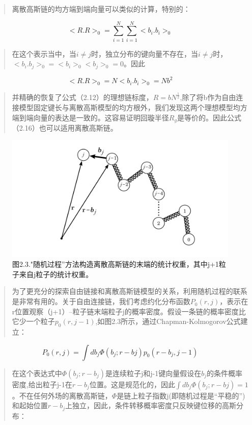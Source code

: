 \begin{quotation}
离散高斯链的均方端到端向量可以类似的计算，特别的：
\end{quotation}
\begin{equation}
<R.R>_{0}=\sum_{i=1}^{N}\sum_{i=1}^{N}<b_{i}.b_{i}>_{0}
\end{equation}
\begin{quotation}
在这个表示当中，当$i\neq j$时，独立分布的键向量不存在，当$i\neq j$时，$<b_{i}.b_{j}>_{0}=<b_{i}>_{0}<b_{j}>_{0}=0$。因此
\end{quotation}
\begin{equation}
<R.R>_{0}=N<b_{i}.b_{i}>_{0}=Nb^2
\end{equation}
\begin{quotation}
并精确的恢复了公式（2.12）的理想链标度，$R=bN^\frac{1}{2}$,除了将b作为自由连接模型固定键长与离散高斯模型的均方根外，我们发现这两个理想模型均方端到端向量的表达是一致的。这容易证明回璇半径$R_{g}$是等价的。因此公式（2.16）也可以适用离散高斯链。
\end{quotation}
\begin{figure}[h]
\centering
\includegraphics[width=12cm]{./figures/23.png}
\caption{图2.3."随机过程”方法构造离散高斯链的末端的统计权重，其中j+1粒子来自j粒子的统计权重。}
\end{figure}
\newpage
\begin{quotation}
为了更充分的探索自由链接和离散高斯链模型的关系，利用随机过程的联系是非常有用的。关于自由连接链，我们考虑约化分布函数$P_{0}(r,j)$，表示在r位置观察（j+1）--粒子链末端粒子j的概率密度。假设一条链的概率密度比它少一个粒子$p_{0}(r,j-1)$,如图2.3所示，通过Chapman-Kolmogorov公式建立：
\end{quotation}
\begin{equation}
P_{0}(r,j)=\int db_{j} \varPhi (b_{j};r-b{j})p_{0}(r-b_{j},j-1)
\end{equation}
\begin{quotation}
在这个表达式中$\varPhi (b_{j};r-b_{j})$是连续粒子j和j-1键向量假设在$b_{j}$的条件概率密度,给出粒子j-1在$r-b_{j}$位置。这是规范化的，因此$\int db_{j} \varPhi (b_{j};r-b{j})=1$。不在任何外场的离散高斯链，$\varPhi$是链上粒子指数j(即随机过程是“平稳的”)和起始位置$r-b_{j}$上独立，因此，条件转移概率密度只反映键位移的高斯分布：
\end{quotation}
